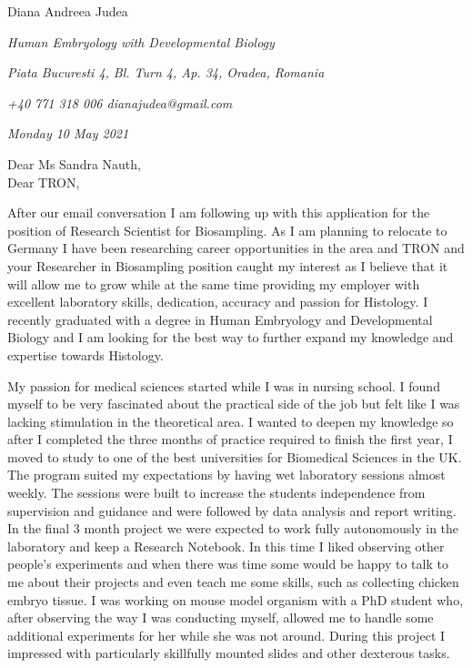 \documentclass[paper=a4,fontsize=11pt]{scrartcl} %
\newcommand{\sepspace}{\vspace*{1em}}		%
\newcommand{\MyName}[1]{ %
  \Huge \usefont{OT1}{phv}{b}{n} \hfill \textcolor{titleColor}{#1}
  \par \normalsize \normalfont}
\newcommand{\MyCoverSlogan}[4]{ %
  \large \usefont{OT1}{phv}{m}{n}\hfill \textcolor{headerColor}{\textit{#1} }
  \sepspace
  \par \normalsize \usefont{OT1}{phv}{m}{n}\hfill \textcolor{headerColor}{\textit{#2}}
  \par \normalsize \usefont{OT1}{phv}{m}{n}\hfill \textcolor{headerColor}{\textit{#3}}
  \par \normalsize \usefont{OT1}{phv}{m}{n}\hfill \textcolor{headerColor}{\textit{#4}}
  \par \normalsize \normalfont}
\begin{document}
  
  \MyName{Diana Andreea Judea}
  \MyCoverSlogan{Human Embryology with Developmental Biology}{Piata Bucuresti 4, Bl.  Turn 4, Ap.  34, Oradea, Romania}{+40 771 318 006 \hspace{5pt} dianajudea@gmail.com}{Monday 10 May 2021}
  \sepspace %
  
  \noindent
  Dear Ms Sandra Nauth, \\
  Dear TRON,

  \sepspace 

  \noindent After our email conversation I am following up with this
  application for the position of Research Scientist for Biosampling.  As I am planning
  to relocate to Germany I have been researching career opportunities in the area and
  TRON and your Researcher in Biosampling position caught my interest as I
  believe that it will allow me to grow while at the same time providing my
  employer with excellent laboratory skills, dedication, accuracy and passion
  for Histology.  I recently graduated with a degree in Human Embryology and
  Developmental Biology and I am looking for the best way to further expand my
  knowledge and expertise towards Histology.

  \sepspace 

  \noindent My passion for medical sciences started while I was in nursing
  school.  I found myself to be very fascinated about the practical side of the
  job but felt like I was lacking stimulation in the theoretical area.  I
  wanted to deepen my knowledge so after I completed the three months of practice
  required to finish the first year, I moved to study to one of the best
  universities for Biomedical Sciences in the UK.  The program suited my
  expectations by having wet laboratory sessions almost weekly.  The sessions
  were built to increase the students independence from supervision and
  guidance and were followed by data analysis and report writing.  In the final
  3 month project we were expected to work fully autonomously in the laboratory
  and keep a Research Notebook.  In this time I liked observing other
  people’s experiments and when there was time some would be happy to talk to
  me about their projects and even teach me some skills, such as
  collecting chicken embryo tissue.  I was working on mouse model organism
  with a PhD student who, after observing the way I was conducting myself,
  allowed me to handle some additional experiments for her while she was not
  around.  During this project I impressed with particularly skillfully
  mounted slides and other dexterous tasks.
\end{document}
